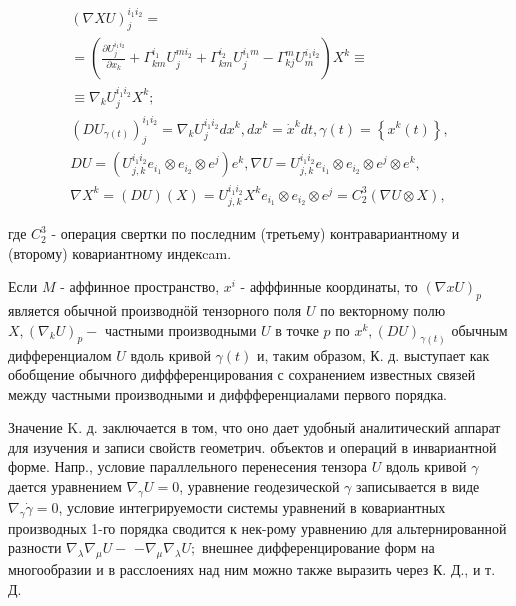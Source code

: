 \documentclass[10pt]{article}
\begin{document}
\[

\begin{gathered}

(\nabla X U)_{j}^{i_{1} i_{2}}= \\

=\left(\frac{\partial U_{j}^{i_{1} i_{2}}}{\partial x_{k}}+\Gamma_{k m}^{i_{1}} U_{j}^{m i_{2}}+\Gamma_{k m}^{i_{2}} U_{j}^{i_{1} m}-\Gamma_{k j}^{m} U_{m}^{i_{1} i_{2}}\right) X^{k} \equiv \\

\equiv \nabla_{k} U_{j}^{i_{1} i_{2}} X^{k} ; \\

\left(D U_{\gamma(t)}\right)_{j}^{i_{1} i_{2}}=\nabla_{k} U_{j}^{i_{1} i_{2}} d x^{k}, d x^{k}=\dot{x}^{k} d t, \gamma(t)=\left\{x^{k}(t)\right\}, \\

D U=\left(U_{j, k}^{i_{1} i_{2}} e_{i_{1}} \otimes e_{i_{2}} \otimes e^{j}\right) e^{k}, \nabla U=U_{j, k}^{i_{1} i_{2}} e_{i_{1}} \otimes e_{i_{2}} \otimes e^{j} \otimes e^{k}, \\

\nabla X^{k}=(D U)(X)=U_{j, k}^{i_{1} i_{2}} X^{k} e_{i_{1}} \otimes e_{i_{2}} \otimes e^{j}=C_{2}^{3}(\nabla U \otimes X),

\end{gathered}

\]



где $C_{2}^{3}$ - операция свертки по последним (третьему) контравариантному и (второму) ковариантному индекcam.



Если $M$ - аффинное пространство, $x^{i}$ - афффинные координаты, то $(\nabla x U)_{p}$ является обычной производнӧй тензорного поля $U$ по векторному полю $X,\left(\nabla_{k} U\right)_{p}-$ частными производными $U$ в точке $p$ по $x^{k},(D U)_{\gamma(t)}$ обычным дифференциалом $U$ вдоль кривой $\gamma(t)$ и, таким образом, К. д. выступает как обобщение обычного диффференцирования с сохранением известных связей между частными производными и диффференциалами первого порядка.



Значение K. д. заключается в том, что оно дает удобный аналитический аппарат для изучения и записи свойств геометрич. объектов и операций в инвариантной форме. Напр., условие параллельного перенесения тензора $U$ вдоль кривой $\gamma$ дается уравнением $\nabla_{\gamma} U=0$, уравнение геодезической $\gamma$ записывается в виде $\nabla_{\gamma} \dot{\gamma}=0$, условие интегрируемости системы уравнений в ковариантных производных 1-го порядка сводится к нек-рому уравнению для альтернированной разности $\nabla_{\lambda} \nabla_{\mu} U-$ $-\nabla_{\mu} \nabla_{\lambda} U ;$ внешнее дифференцирование форм на многообразии и в расслоениях над ним можно также выразить через К. Д., и т. Д.
\end{document}
